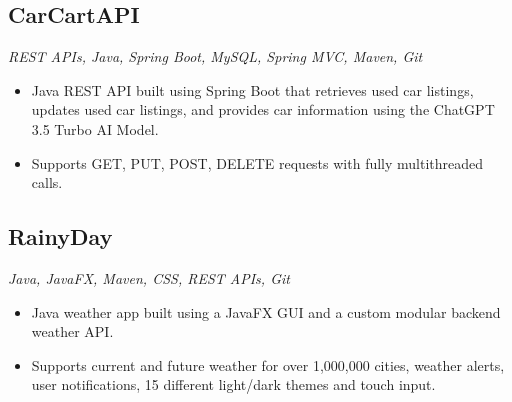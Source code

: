 \documentclass[10pt, a4paper]{article}
\begin{document}
\subsection*{CarCartAPI }
\vspace*{2pt}
\textit{REST APIs, Java, Spring Boot, MySQL, Spring MVC, Maven, Git}
\begin{itemize}
    \item Java REST API built using Spring Boot that retrieves used car listings, updates used car listings, and provides car information using the ChatGPT 3.5 Turbo AI Model.
    \item Supports GET, PUT, POST, DELETE requests with fully multithreaded calls.
\end{itemize}

\subsection*{RainyDay }
\vspace*{2pt}
\textit{Java, JavaFX, Maven, CSS, REST APIs, Git}
\begin{itemize}
    \item Java weather app built using a JavaFX GUI and a custom modular backend weather API.
    \item Supports current and future weather for over 1,000,000 cities, weather alerts, user notifications, 15 different light/dark themes and touch input.
\end{itemize}

\end{document}
